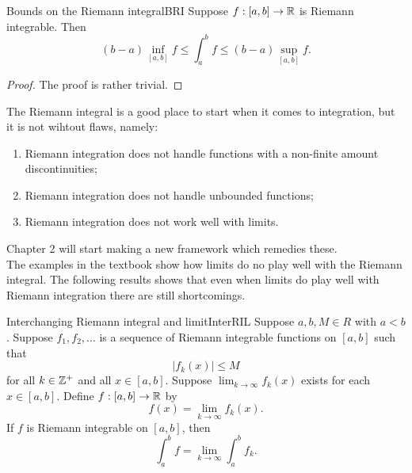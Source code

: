 \documentclass[twoside, openright, fontsize=10pt, headings=big]{scrbook}
\begin{document}
\begin{theorem}{Bounds on the Riemann integral}{BRI}
    Suppose $f : [a, b] \to \mathbb{R}$ is Riemann integrable. Then
    \[
        (b-a)\underset{[a,b]}{\inf}f\leq \int_{a}^{b}f\leq(b-a)\underset{[a,b]}{\sup}f.
    \]
\end{theorem}
\begin{proof}
    The proof is rather trivial.
\end{proof}
The Riemann integral is a good place to start when it comes to integration, but it is not wihtout flaws, namely:
\begin{enumerate}
    \item Riemann integration does not handle functions with a non-finite amount discontinuities;
    \item Riemann integration does not handle unbounded functions;
    \item Riemann integration does not work well with limits.
\end{enumerate}
Chapter 2 will start making a new framework which remedies these.\\
The examples in the textbook show how limits do no play well with the Riemann integral. The following results shows that even when limits do play well with Riemann integration there are still shortcomings.
\begin{lemma}{Interchanging Riemann integral and limit}{InterRIL}
Suppose $a, b, M \in R$ with $a < b$. Suppose $f_1, f_2,\dots$ is a sequence of Riemann integrable functions on $[a, b]$ such that
\[
    |f_k(x)|\leq M
\]
for all $k \in \mathbb{Z}^+$ and all $x \in [a, b]$. Suppose $\lim_{k\to\infty} f_k(x)$ exists for each $x\in[a,b]$. Define $f:[a,b]\to\mathbb{R}$ by
\[
    f(x)=\lim_{k\to\infty}f_k(x).
\]
If $f$ is Riemann integrable on $[a, b]$, then
\[
    \int_{a}^{b}f=\lim_{k\to\infty}\int_{a}^{b}f_k.
\]
\end{lemma}
\end{document}
